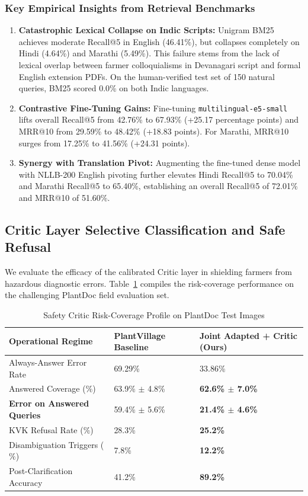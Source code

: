 \documentclass[conference]{IEEEtran}
\begin{document}
\subsubsection{Key Empirical Insights from Retrieval Benchmarks}
\begin{enumerate}
    \item \textbf{Catastrophic Lexical Collapse on Indic Scripts:} Unigram BM25 achieves moderate Recall@5 in English (46.41\%), but collapses completely on Hindi (4.64\%) and Marathi (5.49\%). This failure stems from the lack of lexical overlap between farmer colloquialisms in Devanagari script and formal English extension PDFs. On the human-verified test set of 150 natural queries, BM25 scored 0.0\% on both Indic languages.
    \item \textbf{Contrastive Fine-Tuning Gains:} Fine-tuning \texttt{multilingual-e5-small} lifts overall Recall@5 from 42.76\% to 67.93\% (+25.17 percentage points) and MRR@10 from 29.59\% to 48.42\% (+18.83 points). For Marathi, MRR@10 surges from 17.25\% to 41.56\% (+24.31 points).
    \item \textbf{Synergy with Translation Pivot:} Augmenting the fine-tuned dense model with NLLB-200 English pivoting further elevates Hindi Recall@5 to 70.04\% and Marathi Recall@5 to 65.40\%, establishing an overall Recall@5 of 72.01\% and MRR@10 of 51.60\%.
\end{enumerate}

\subsection{Critic Layer Selective Classification and Safe Refusal}
We evaluate the efficacy of the calibrated Critic layer in shielding farmers from hazardous diagnostic errors. Table~\ref{tab:critic_results} compiles the risk-coverage performance on the challenging PlantDoc field evaluation set.

\begin{table}[htbp]
\caption{Safety Critic Risk-Coverage Profile on PlantDoc Test Images}
\label{tab:critic_results}
\begin{center}
\begin{tabularx}{\columnwidth}{lXX}
\toprule
\textbf{Operational Regime} & \textbf{PlantVillage Baseline} & \textbf{Joint Adapted + Critic (Ours)} \\
\midrule
Always-Answer Error Rate & 69.29\% & 33.86\% \\
Answered Coverage ($\%$) & 63.9\% $\pm$ 4.8\% & \textbf{62.6\% $\pm$ 7.0\%} \\
\textbf{Error on Answered Queries} & 59.4\% $\pm$ 5.6\% & \textbf{21.4\% $\pm$ 4.6\%} \\
KVK Refusal Rate ($\%$) & 28.3\% & \textbf{25.2\%} \\
Disambiguation Triggers ($\%$) & 7.8\% & \textbf{12.2\%} \\
Post-Clarification Accuracy & 41.2\% & \textbf{89.2\%} \\
\bottomrule
\end{tabularx}
\end{center}
\end{table}
\end{document}
